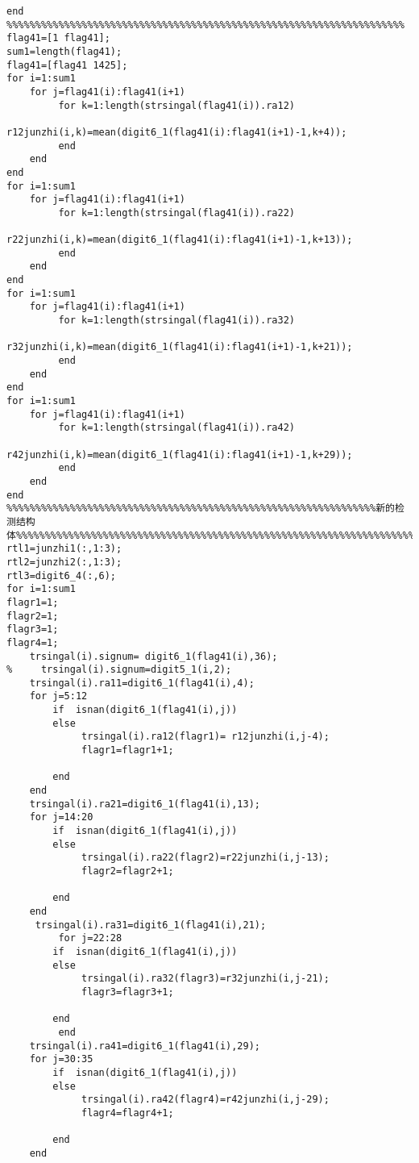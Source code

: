 \begin{appendix}
\begin{lstlisting}[caption=synthesize.m]
end
%%%%%%%%%%%%%%%%%%%%%%%%%%%%%%%%%%%%%%%%%%%%%%%%%%%%%%%%%%%%%%%%%%%%%
flag41=[1 flag41];
sum1=length(flag41);
flag41=[flag41 1425];
for i=1:sum1
    for j=flag41(i):flag41(i+1)
         for k=1:length(strsingal(flag41(i)).ra12)
             r12junzhi(i,k)=mean(digit6_1(flag41(i):flag41(i+1)-1,k+4));
         end
    end
end
for i=1:sum1
    for j=flag41(i):flag41(i+1)
         for k=1:length(strsingal(flag41(i)).ra22)
             r22junzhi(i,k)=mean(digit6_1(flag41(i):flag41(i+1)-1,k+13));
         end
    end
end
for i=1:sum1
    for j=flag41(i):flag41(i+1)
         for k=1:length(strsingal(flag41(i)).ra32)
             r32junzhi(i,k)=mean(digit6_1(flag41(i):flag41(i+1)-1,k+21));
         end
    end
end
for i=1:sum1
    for j=flag41(i):flag41(i+1)
         for k=1:length(strsingal(flag41(i)).ra42)
             r42junzhi(i,k)=mean(digit6_1(flag41(i):flag41(i+1)-1,k+29));
         end
    end
end
%%%%%%%%%%%%%%%%%%%%%%%%%%%%%%%%%%%%%%%%%%%%%%%%%%%%%%%%%%%%%%%%新的检测结构体%%%%%%%%%%%%%%%%%%%%%%%%%%%%%%%%%%%%%%%%%%%%%%%%%%%%%%%%%%%%%%%%%%%%%%%%
rtl1=junzhi1(:,1:3);
rtl2=junzhi2(:,1:3);
rtl3=digit6_4(:,6);
for i=1:sum1
flagr1=1;
flagr2=1;
flagr3=1;
flagr4=1;
    trsingal(i).signum= digit6_1(flag41(i),36);
%     trsingal(i).signum=digit5_1(i,2);
    trsingal(i).ra11=digit6_1(flag41(i),4);
    for j=5:12
        if  isnan(digit6_1(flag41(i),j))
        else
             trsingal(i).ra12(flagr1)= r12junzhi(i,j-4);
             flagr1=flagr1+1;
             
        end
    end
    trsingal(i).ra21=digit6_1(flag41(i),13);
    for j=14:20
        if  isnan(digit6_1(flag41(i),j))
        else
             trsingal(i).ra22(flagr2)=r22junzhi(i,j-13);
             flagr2=flagr2+1;
             
        end
    end
     trsingal(i).ra31=digit6_1(flag41(i),21);
         for j=22:28
        if  isnan(digit6_1(flag41(i),j))
        else
             trsingal(i).ra32(flagr3)=r32junzhi(i,j-21);
             flagr3=flagr3+1;
             
        end
         end
    trsingal(i).ra41=digit6_1(flag41(i),29);
    for j=30:35
        if  isnan(digit6_1(flag41(i),j))
        else
             trsingal(i).ra42(flagr4)=r42junzhi(i,j-29);
             flagr4=flagr4+1;
             
        end
    end
    

\end{lstlisting}
\end{appendix}
